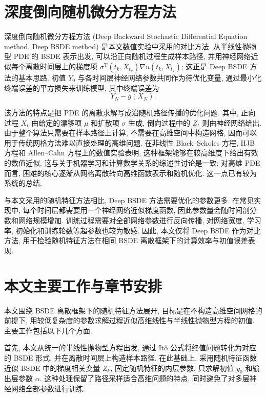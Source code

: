   \section{深度倒向随机微分方程方法}\label{sec:deepbsde_intro}
    深度倒向随机微分方程方法 (Deep Backward Stochastic Differential Equation method, Deep BSDE method)
    是本文数值实验中采用的对比方法.
    从半线性抛物型 PDE 的 BSDE 表示出发,
    可以沿正向随机过程生成样本路径, 并用神经网络近似每个离散时间层上的梯度项
    $\sigma^{\operatorname T}(t_k,X_{t_k})\nabla u(t_k,X_{t_k})$;
    这正是 Deep BSDE 方法的基本思路\cite{eDeepLearningBasedNumerical2017,hanSolvingHighdimensionalPartial2018}.
    初值 $Y_0$ 与各时间层神经网络参数共同作为待优化变量,
    通过最小化终端误差的平方损失来训练模型, 其中终端误差为
    \begin{equation*}
      Y_N - g(X_N).
    \end{equation*}

    该方法的特点是把 PDE 的离散求解写成沿随机路径传播的优化问题.
    其中, 正向过程 $X_t$ 由给定的漂移项 $\mu$ 和扩散项 $\sigma$ 生成,
    倒向过程中的 $Z_t$ 则由神经网络给出.
    由于整个算法只需要在样本路径上计算, 不需要在高维空间中构造网格,
    因而可以用于传统网格方法难以直接处理的高维问题.
    在非线性 Black--Scholes 方程, HJB 方程和 Allen--Cahn 方程上的数值实验表明,
    这种框架能够在较高维度下给出有效的数值近似\cite{hanSolvingHighdimensionalPartial2018}.
    这与关于机器学习和计算数学关系的综述性讨论是一致:
    对高维 PDE 而言, 困难的核心逐渐从网格离散转向高维函数表示和随机优化.
    这一点已有较为系统的总结\cite{eMachineLearningComputational2020}.

    与本文采用的随机特征方法相比, Deep BSDE 方法需要优化的参数更多.
    在常见实现中, 每个时间层都需要用一个神经网络近似梯度函数,
    因此参数量会随时间剖分数和网络规模增加.
    训练过程需要对全部网络参数进行反向传播,
    对网络宽度, 学习率, 初始化和训练轮数等超参数也较为敏感.
    因此, 本文仅将 Deep BSDE 作为对比方法, 用于检验随机特征方法在相同 BSDE 离散框架下的计算效率与初值误差表现.

  \section{本文主要工作与章节安排}\label{sec:work}
    本文围绕 BSDE 离散框架下的随机特征方法展开, 目标是在不构造高维空间网格的前提下,
    用较低复杂度的参数求解过程近似高维线性与半线性抛物型方程的初值.
    主要工作包括以下几个方面.

    首先, 本文从统一的半线性抛物型方程出发,
    通过 Itô 公式将终值问题转化为对应的 BSDE 形式,
    并在离散时间层上构造样本路径.
    在此基础上, 采用随机特征函数近似 BSDE 中的梯度相关变量 $Z_k$,
    固定随机特征的内层参数, 只求解初值 $y_0$ 和输出层参数 $\alpha$.
    这种处理保留了路径采样适合高维问题的特点,
    同时避免了对多层神经网络全部参数进行训练.

